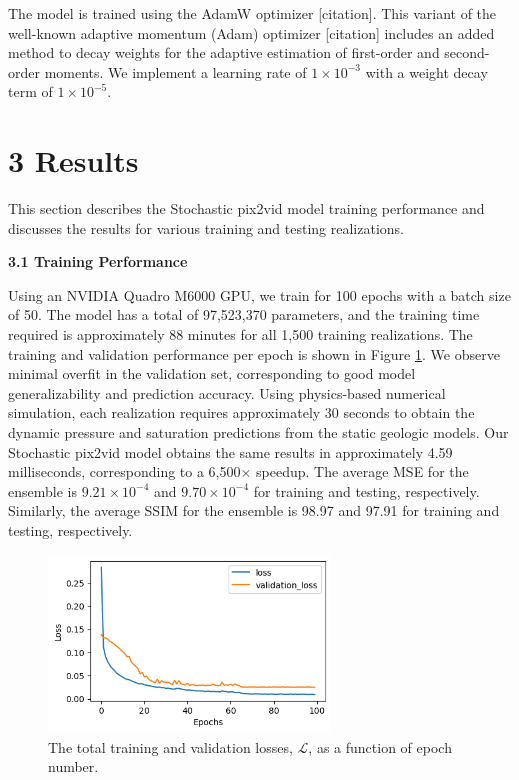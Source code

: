 \documentclass[10pt, twoside]{article}
\begin{document}
The model is trained using the AdamW optimizer [citation]. This variant of the well-known adaptive momentum (Adam) optimizer [citation] includes an added method to decay weights for the adaptive estimation of first-order and second-order moments. We implement a learning rate of $1\times10^{-3}$ with a weight decay term of $1\times10^{-5}$. 


\section*{\textbf{3 Results}}

This section describes the Stochastic pix2vid model training performance and discusses the results for various training and testing realizations.

\textbf{3.1 Training Performance}

Using an NVIDIA Quadro M6000 GPU, we train for 100 epochs with a batch size of 50. The model has a total of 97,523,370 parameters, and the training time required is approximately 88 minutes for all 1,500 training realizations. The training and validation performance per epoch is shown in Figure \ref{train_perf}. We observe minimal overfit in the validation set, corresponding to good model generalizability and prediction accuracy. Using physics-based numerical simulation, each realization requires approximately 30 seconds to obtain the dynamic pressure and saturation predictions from the static geologic models. Our Stochastic pix2vid model obtains the same results in approximately 4.59 milliseconds, corresponding to a 6,500× speedup. The average MSE for the ensemble is $9.21\times10^{-4}$ and $9.70\times10^{-4}$ for training and testing, respectively. Similarly, the average SSIM for the ensemble is 98.97 and 97.91 for training and testing, respectively.

\begin{figure}[h]
    \centering
    \includegraphics[width=7.5cm]{figures/train_performance.png}
    \caption{The total training and validation losses, $\mathcal{L}$, as a function of epoch number.}
    \label{train_perf}
\end{figure}
\end{document}

